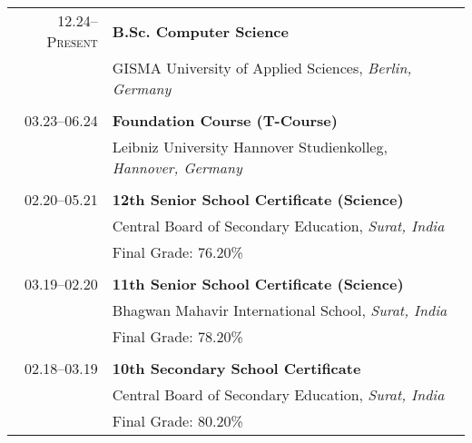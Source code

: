 \documentclass[12pt,a4paper]{moderncv}
\begin{document}
\begin{tabular}{r l}	
    \textsc{12.24}--\textsc{Present} \hspace{0.5em} 
        & \textbf{B.Sc. Computer Science} \\
        & GISMA University of Applied Sciences, \textit{Berlin, Germany} \\
        & \\  %
        
    \textsc{03.23}--\textsc{06.24} \hspace{0.5em} 
        & \textbf{Foundation Course (T-Course)} \\
        & Leibniz University Hannover Studienkolleg, \textit{Hannover, Germany} \\
        & \\  %
        
    \textsc{02.20}--\textsc{05.21} \hspace{0.5em} 
        & \textbf{12th Senior School Certificate (Science)} \\
        & Central Board of Secondary Education, \textit{Surat, India} \\
        & Final Grade: 76.20\% \\
        & \\  %
        
    \textsc{03.19}--\textsc{02.20} \hspace{0.5em} 
        & \textbf{11th Senior School Certificate (Science)} \\
        & Bhagwan Mahavir International School, \textit{Surat, India} \\
        & Final Grade: 78.20\% \\
        & \\  %
        
    \textsc{02.18}--\textsc{03.19} \hspace{0.5em} 
        & \textbf{10th Secondary School Certificate} \\ 
        & Central Board of Secondary Education, \textit{Surat, India} \\
        & Final Grade: 80.20\% \\
\end{tabular}





\vspace{0.5cm}
\end{document}
